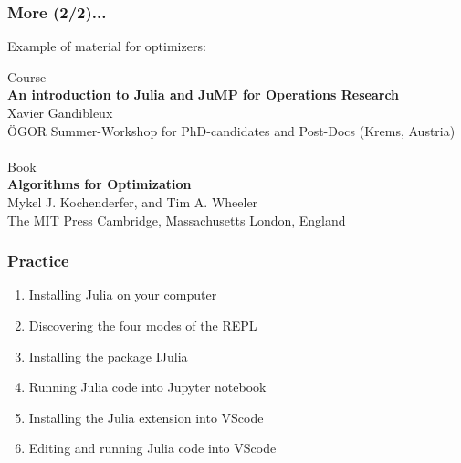 \documentclass[]{beamer}
\begin{document}
% 
%

\begin{frame}
  \frametitle{More (2/2)...}
\vspace{3mm}

Example of material for optimizers:\vspace{6mm}\\
{\footnotesize

Course \vspace{2mm}\\
\quad \textbf{An introduction to Julia and JuMP for Operations Research}\\
\quad Xavier Gandibleux\\
\quad ÖGOR Summer-Workshop for PhD-candidates and Post-Docs (Krems, Austria)\\
\vspace{6mm}\\

Book \vspace{2mm}\\
\quad \textbf{Algorithms for Optimization}\\
\quad Mykel J. Kochenderfer, and Tim A. Wheeler\\
\quad The MIT Press Cambridge, Massachusetts London, England\\

}
\end{frame}

% 
%

\begin{frame}
  \frametitle{Practice}
\vspace{3mm}

\begin{enumerate}
\item Installing Julia on your computer

\item Discovering the four modes of the REPL\vspace{3mm}

\item Installing the package IJulia

\item Running Julia code into Jupyter notebook\vspace{3mm}

\item Installing the Julia extension into VScode

\item Editing and running Julia code into  VScode
\end{enumerate}

\end{frame}
\end{document}
